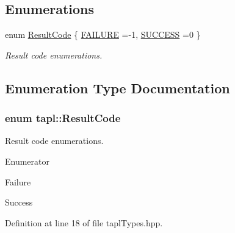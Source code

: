 \subsection*{Enumerations}
\begin{DoxyCompactItemize}
\item 
enum \hyperlink{namespacetapl_a196ce1d5bf399fc26f03797e6a8d03ff}{Result\+Code} \{ \hyperlink{namespacetapl_a196ce1d5bf399fc26f03797e6a8d03ffaa6e243674a964518a62bdda7f20f6453}{F\+A\+I\+L\+U\+RE} =-\/1, 
\hyperlink{namespacetapl_a196ce1d5bf399fc26f03797e6a8d03ffafbdd78b1e8654e11461f37fea68c6195}{S\+U\+C\+C\+E\+SS} =0
 \}\begin{DoxyCompactList}\small\item\em Result code enumerations. \end{DoxyCompactList}
\end{DoxyCompactItemize}


\subsection{Enumeration Type Documentation}
\subsubsection[{\texorpdfstring{Result\+Code}{ResultCode}}]{\setlength{\rightskip}{0pt plus 5cm}enum {\bf tapl\+::\+Result\+Code}}\hypertarget{namespacetapl_a196ce1d5bf399fc26f03797e6a8d03ff}{}\label{namespacetapl_a196ce1d5bf399fc26f03797e6a8d03ff}


Result code enumerations. 

\begin{Desc}
\item[Enumerator]\par
\begin{description}
\item[{\em 
F\+A\+I\+L\+U\+RE\hypertarget{namespacetapl_a196ce1d5bf399fc26f03797e6a8d03ffaa6e243674a964518a62bdda7f20f6453}{}\label{namespacetapl_a196ce1d5bf399fc26f03797e6a8d03ffaa6e243674a964518a62bdda7f20f6453}
}]Failure \item[{\em 
S\+U\+C\+C\+E\+SS\hypertarget{namespacetapl_a196ce1d5bf399fc26f03797e6a8d03ffafbdd78b1e8654e11461f37fea68c6195}{}\label{namespacetapl_a196ce1d5bf399fc26f03797e6a8d03ffafbdd78b1e8654e11461f37fea68c6195}
}]Success \end{description}
\end{Desc}


Definition at line 18 of file tapl\+Types.\+hpp.

